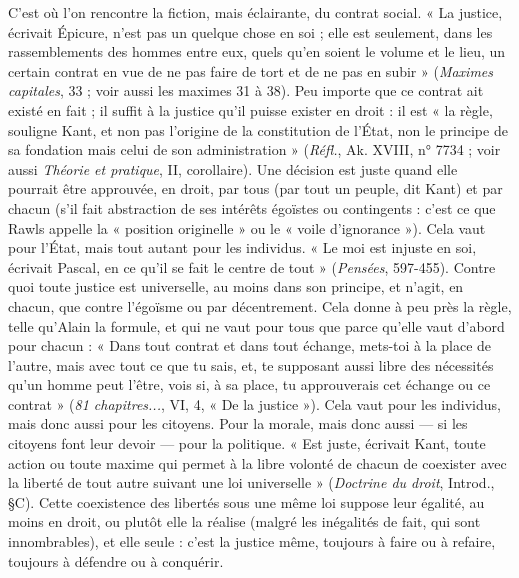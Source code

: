 {C’est où l’on rencontre la fiction, mais éclairante, du contrat social. « La
justice, écrivait Épicure, n’est pas un quelque chose en soi ; elle est seulement,
dans les rassemblements des hommes entre eux, quels qu’en soient le volume et
le lieu, un certain contrat en vue de ne pas faire de tort et de ne pas en subir »
({\it Maximes capitales}, 33 ; voir aussi les maximes 31 à 38). Peu importe que ce
contrat ait existé en fait ; il suffit à la justice qu’il puisse exister en droit : il est
« la règle, souligne Kant, et non pas l’origine de la constitution de l’État, non
le principe de sa fondation mais celui de son administration » ({\it Réfl.}, Ak. XVIII,
n° 7734 ; voir aussi {\it Théorie et pratique}, II, corollaire). Une décision est juste
quand elle pourrait être approuvée, en droit, par tous (par tout un peuple, dit
Kant) et par chacun (s’il fait abstraction de ses intérêts égoïstes ou contingents :
c’est ce que Rawls appelle la « position originelle » ou le « voile d’ignorance »).
Cela vaut pour l’État, mais tout autant pour les individus. « Le moi est injuste
en soi, écrivait Pascal, en ce qu’il se fait le centre de tout » ({\it Pensées}, 597-455).
Contre quoi toute justice est universelle, au moins dans son principe, et n’agit,
en chacun, que contre l’égoïsme ou par décentrement. Cela donne à peu près
la règle, telle qu’Alain la formule, et qui ne vaut pour tous que parce qu’elle
vaut d’abord pour chacun : « Dans tout contrat et dans tout échange, mets-toi
à la place de l’autre, mais avec tout ce que tu sais, et, te supposant aussi libre
des nécessités qu’un homme peut l'être, vois si, à sa place, tu approuverais cet
échange ou ce contrat » ({\it 81 chapitres...}, VI, 4, « De la justice »). Cela vaut pour
les individus, mais donc aussi pour les citoyens. Pour la morale, mais donc aussi
— si les citoyens font leur devoir — pour la politique. « Est juste, écrivait Kant,
toute action ou toute maxime qui permet à la libre volonté de chacun de
coexister avec la liberté de tout autre suivant une loi universelle » ({\it Doctrine du
droit}, Introd., \S C). Cette coexistence des libertés sous une même loi suppose
leur égalité, au moins en droit, ou plutôt elle la réalise (malgré les inégalités de
fait, qui sont innombrables), et elle seule : c’est la justice même, toujours à faire
ou à refaire, toujours à défendre ou à conquérir.

}
